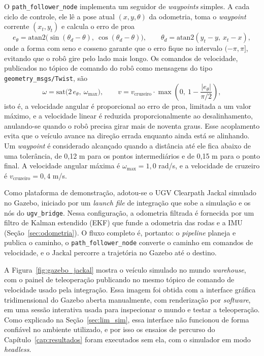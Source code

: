 \documentclass[
    12pt,
    openright,
    oneside,
    a4paper,
    english,
    brazil
]{abntex2}
\begin{document}
O \texttt{path\_\allowbreak{}follower\_\allowbreak{}node} implementa um seguidor de \textit{waypoints} simples. A cada ciclo de controle, ele lê a pose atual $(x, y, \theta)$ da odometria, toma o \textit{waypoint} corrente $(x_t, y_t)$ e calcula o erro de proa
\[
e_\theta = \mathrm{atan2}\big(\sin(\theta_d - \theta),\ \cos(\theta_d - \theta)\big),
\qquad
\theta_d = \mathrm{atan2}(y_t - y,\ x_t - x),
\]
onde a forma com seno e cosseno garante que o erro fique no intervalo $(-\pi, \pi]$, evitando que o robô gire pelo lado mais longo. Os comandos de velocidade, publicados no tópico de comando do robô como mensagens do tipo \texttt{geometry\_\allowbreak{}msgs/\allowbreak{}Twist}, são
\[
\omega = \mathrm{sat}\big(2\,e_\theta,\ \omega_{\max}\big),
\qquad
v = v_{\text{cruzeiro}} \cdot \max\left(0,\ 1 - \frac{|e_\theta|}{\pi/2}\right),
\]
isto é, a velocidade angular é proporcional ao erro de proa, limitada a um valor máximo, e a velocidade linear é reduzida proporcionalmente ao desalinhamento, anulando-se quando o robô precisa girar mais de noventa graus. Esse acoplamento evita que o veículo avance na direção errada enquanto ainda está se alinhando. Um \textit{waypoint} é considerado alcançado quando a distância até ele fica abaixo de uma tolerância, de 0,12 m para os pontos intermediários e de 0,15 m para o ponto final. A velocidade angular máxima é $\omega_{\max} = 1{,}0$ rad/s, e a velocidade de cruzeiro é $v_{\text{cruzeiro}} = 0{,}4$ m/s.

Como plataforma de demonstração, adotou-se o UGV Clearpath Jackal simulado no Gazebo, iniciado por um \textit{launch file} de integração que sobe a simulação e os nós do \texttt{ugv\_\allowbreak{}bridge}. Nessa configuração, a odometria filtrada é fornecida por um filtro de Kalman estendido (EKF) que funde a odometria das rodas e a IMU (Seção~\ref{sec:odometria}). O fluxo completo é, portanto: o \textit{pipeline} planeja e publica o caminho, o \texttt{path\_\allowbreak{}follower\_\allowbreak{}node} converte o caminho em comandos de velocidade, e o Jackal percorre a trajetória no Gazebo até o destino.

A Figura~\ref{fig:gazebo_jackal} mostra o veículo simulado no mundo \textit{warehouse}, com o painel de teleoperação publicando no mesmo tópico de comando de velocidade usado pela integração. Essa imagem foi obtida com a interface gráfica tridimensional do Gazebo aberta manualmente, com renderização por \textit{software}, em uma sessão interativa usada para inspecionar o mundo e testar a teleoperação. Como explicado na Seção~\ref{sec:lim_sim}, essa interface não funcionou de forma confiável no ambiente utilizado, e por isso os ensaios de percurso do Capítulo~\ref{cap:resultados} foram executados sem ela, com o simulador em modo \textit{headless}.
\end{document}
